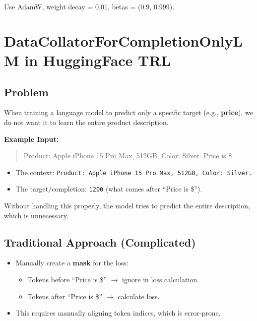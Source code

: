 \documentclass[a4paper, 12pt]{article}
\begin{document}
\begin{tcolorbox}[colback=red!5,colframe=red!70!black,title=Rule of Thumb]
Use AdamW, weight decay = 0.01, betas = (0.9, 0.999).
\end{tcolorbox}

\newpage
\section*{DataCollatorForCompletionOnlyLM in HuggingFace TRL}

\subsection*{Problem}
When training a language model to predict only a specific target (e.g., \textbf{price}), we do not want it to learn the entire product description.

\textbf{Example Input:}  
\begin{quote}
Product: Apple iPhone 15 Pro Max, 512GB, Color: Silver. Price is \$
\end{quote}

\begin{itemize}
    \item The context: \texttt{Product: Apple iPhone 15 Pro Max, 512GB, Color: Silver.}  
    \item The target/completion: \texttt{1200} (what comes after ``Price is \$'').
\end{itemize}

Without handling this properly, the model tries to predict the entire description, which is unnecessary.

\subsection*{Traditional Approach (Complicated)}
\begin{itemize}
    \item Manually create a \textbf{mask} for the loss:
    \begin{itemize}
        \item Tokens before ``Price is \$'' $\rightarrow$ ignore in loss calculation.
        \item Tokens after ``Price is \$'' $\rightarrow$ calculate loss.
    \end{itemize}
    \item This requires manually aligning token indices, which is error-prone.
\end{itemize}
\end{document}
